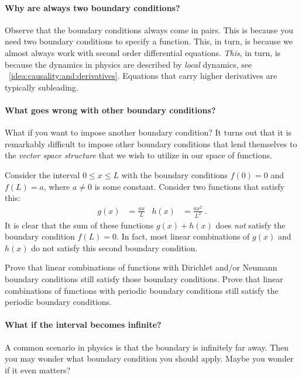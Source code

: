 \documentclass[12pt, oneside]{report}    %
\begin{document}
\paragraph{Why are always two boundary conditions?} Observe that the boundary conditions always come in pairs. This is because you need two boundary conditions to specify a function. This, in turn, is because we almost always work with second order differential equations. \emph{This}, in turn, is because the dynamics in physics are described by \emph{local} dynamics, see \bigidearef{}~\ref{idea:causality:and:derivatives}. Equations that carry higher derivatives are typically subleading.

\paragraph{What goes wrong with other boundary conditions?}
% 
What if you want to impose another boundary condition? It turns out that it is remarkably difficult to impose other boundary conditions that lend themselves to the \emph{vector space structure} that we wish to utilize in our space of functions.

\begin{example}
Consider the interval $0\leq x \leq L$ with the boundary conditions $f(0)=0$ and $f(L)=a$, where $a\neq 0$ is some constant. Consider two functions that satisfy this:
\begin{align}
    g(x) &= \frac{ax}{L}
    &
    h(x) &= \frac{ax^2}{L^2} \ .
\end{align}
It is clear that the sum of these functions $g(x)+h(x)$ does \emph{not} satisfy the boundary condition $f(L)=0$. In fact, most linear combinations of $g(x)$ and $h(x)$ do not satisfy this second boundary condition.
\end{example}
\begin{exercise}
Prove that linear combinations of functions with Dirichlet and/or Neumann boundary conditions still satisfy those boundary conditions. Prove that linear combinations of functions with periodic boundary conditions still satisfy the periodic boundary conditions.
\end{exercise}

\paragraph{What if the interval becomes infinite?}
A common scenario in physics is that the boundary is infinitely far away. Then you may wonder what boundary condition you should apply. Maybe you wonder if it even matters?
\end{document}
